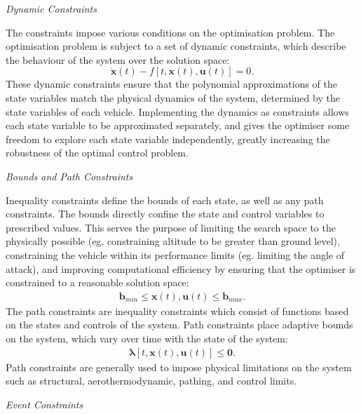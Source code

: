 \noindent \textit{Dynamic Constraints}

\noindent The constraints impose various conditions on the optimisation problem.
The optimisation problem is subject to a set of dynamic constraints, which describe the behaviour of the system over the solution space:
\begin{equation} \label{eq:state}
\dot{\textbf{x}}(t) - f[t,\textbf{x}(t),\textbf{u}(t)] = 0.
\end{equation}
These dynamic constraints ensure that the polynomial approximations of the state variables match the physical dynamics of the system, determined by the state variables of each vehicle. Implementing the dynamics as constraints allows each state variable to be approximated separately, and gives the optimiser some freedom to explore each state variable independently, greatly increasing the robustness of the optimal control problem.



\noindent \textit{Bounds and Path Constraints}

\noindent Inequality constraints define the bounds of each state, as well as any path constraints.
The bounds directly confine the state and control variables to prescribed values. This serves the purpose of limiting the search space to the physically possible (eg. constraining altitude to be greater than ground level), constraining the vehicle within its performance limits (eg. limiting the angle of attack), and improving computational efficiency by ensuring that the optimiser is constrained to a reasonable solution space:
\begin{eqnarray}
\mathbf{b}_{min} \leq \textbf{x}(t),\textbf{u}(t) \leq \mathbf{b}_{max}.
\end{eqnarray}
The path constraints are inequality constraints which consist of functions based on the states and controls of the system. Path constraints place adaptive bounds on the system, which vary over time with the state of the system:
\begin{eqnarray}
\mathbf{\lambda}[t,\textbf{x}(t),\textbf{u}(t)] \leq \textbf{0}.
\end{eqnarray}
Path constraints are generally used to impose physical limitations on the system such as structural, aerothermodynamic, pathing, and control limits.

\noindent \textit{Event Constraints}

